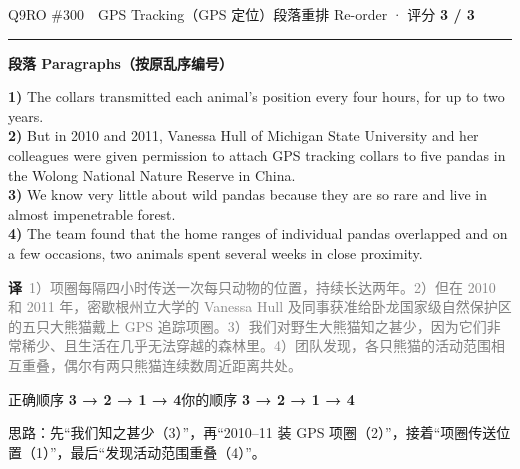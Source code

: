 \documentclass[11pt]{article}
\newcommand{\ptesub}[1]{%
  \par\needspace{2\baselineskip}\smallskip
  {\color{cAccent}\rule[-0.2ex]{3pt}{1.05em}}\hspace{6pt}%
  {\bfseries\color{cHead}#1}\par\nopagebreak\smallskip}
\newcommand{\zh}[1]{{\footnotesize\textcolor{cNote}{\textbf{译}}\ \textcolor{gray}{#1}}}
\begin{document}
\begin{qblock}{Q9\quad RO \#300\ \ GPS Tracking（GPS 定位）}{段落重排 Re-order · 评分 \textcolor{cAccent}{\bfseries 3 / 3}}
\ptesub{段落 Paragraphs（按原乱序编号）}
\begin{promptbox}\small
\textbf{1)} The collars transmitted each animal's position every four hours, for up to two years.\\[2pt]
\textbf{2)} But in 2010 and 2011, Vanessa Hull of Michigan State University and her colleagues were given permission to attach GPS tracking collars to five pandas in the Wolong National Nature Reserve in China.\\[2pt]
\textbf{3)} We know very little about wild pandas because they are so rare and live in almost impenetrable forest.\\[2pt]
\textbf{4)} The team found that the home ranges of individual pandas overlapped and on a few occasions, two animals spent several weeks in close proximity.
\end{promptbox}
\zh{1）项圈每隔四小时传送一次每只动物的位置，持续长达两年。2）但在 2010 和 2011 年，密歇根州立大学的 Vanessa Hull 及同事获准给卧龙国家级自然保护区的五只大熊猫戴上 GPS 追踪项圈。3）我们对野生大熊猫知之甚少，因为它们非常稀少、且生活在几乎无法穿越的森林里。4）团队发现，各只熊猫的活动范围相互重叠，偶尔有两只熊猫连续数周近距离共处。}
\smallskip\par
{\small 正确顺序 \textcolor{cFix}{\bfseries 3 → 2 → 1 → 4}\qquad 你的顺序 \textcolor{cFix}{\bfseries 3 → 2 → 1 → 4}}
\par{\footnotesize\color{gray}思路：先“我们知之甚少（3）”，再“2010–11 装 GPS 项圈（2）”，接着“项圈传送位置（1）”，最后“发现活动范围重叠（4）”。}
\end{qblock}
\end{document}
